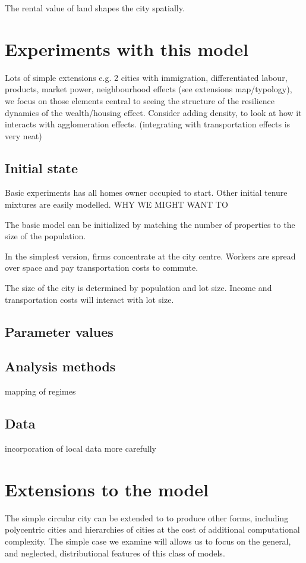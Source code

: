 The rental value of land shapes the city spatially.  

\section{Experiments with this model}
Lots of simple extensions e.g. 2 cities with immigration, differentiated labour, products, market power, neighbourhood effects (see extensions map/typology), we focus on those elements central to seeing the structure of the resilience dynamics of the wealth/housing effect. Consider adding density, to look at how it interacts with agglomeration effects. (integrating with transportation effects is very neat)

\subsection{Initial state}
Basic experiments has all homes owner occupied to start. Other initial tenure mixtures are easily modelled. WHY WE MIGHT WANT TO

The basic model can be initialized by matching the number of properties to the size of the population. 

In the simplest version, firms concentrate at the city centre. Workers are spread over space and pay transportation costs to commute.

The size of the city is determined by population and lot size. Income and transportation costs will interact with lot size. 

\subsection{Parameter values}

\subsection{Analysis methods}
mapping of regimes

\subsection{Data}
incorporation of local data more carefully

\section{Extensions to the model}
The simple circular city can be extended to to produce other forms, including polycentric cities and hierarchies of cities at the cost of additional computational complexity. The simple case we examine will allows us to focus on the general, and neglected, distributional features of this class of models.

